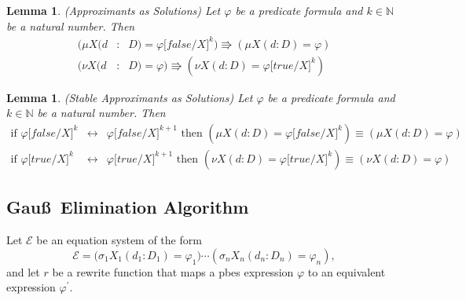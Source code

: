 \documentclass{article}
\newtheorem{lemma}[theorem]{Lemma}
\begin{document}
\begin{lemma}
(Approximants as Solutions) Let $\varphi $ be a predicate formula and $k\in 
\mathbb{N}$ be a natural number. Then%
\begin{eqnarray*}
(\mu X(d &:&D)=\varphi \lbrack false /X]^{k})\Rrightarrow (\mu
X(d:D)=\varphi ) \\
(\nu X(d &:&D)=\varphi )\Rrightarrow (\nu X(d:D)=\varphi \lbrack true
/X]^{k})
\end{eqnarray*}
\end{lemma}

\begin{lemma}
(Stable Approximants as Solutions) Let $\varphi $ be a predicate formula and 
$k\in \mathbb{N}$ be a natural number. Then%
\begin{eqnarray*}
\text{if }\varphi \lbrack false/X]^{k} &\longleftrightarrow &\varphi \lbrack
false/X]^{k+1}\text{ then }(\mu X(d:D)=\varphi \lbrack false/X]^{k})\equiv
(\mu X(d:D)=\varphi ) \\
\text{if }\varphi \lbrack true/X]^{k} &\longleftrightarrow &\varphi \lbrack
true/X]^{k+1}\text{ then }(\nu X(d:D)=\varphi \lbrack true/X]^{k})\equiv
(\nu X(d:D)=\varphi )
\end{eqnarray*}
\end{lemma}

\subsection{Gau\ss\ Elimination Algorithm}

Let $\mathcal{E}$ be an equation system of the form%
\begin{equation*}
\mathcal{E=(}\sigma _{1}X_{1}(d_{1}:D_{1})=\varphi _{1})\cdots (\sigma
_{n}X_{n}(d_{n}:D_{n})=\varphi _{n}),
\end{equation*}%
and let $r$ be a rewrite function that maps a pbes expression $\varphi $ to
an equivalent expression $\varphi ^{\prime }$.
\end{document}
